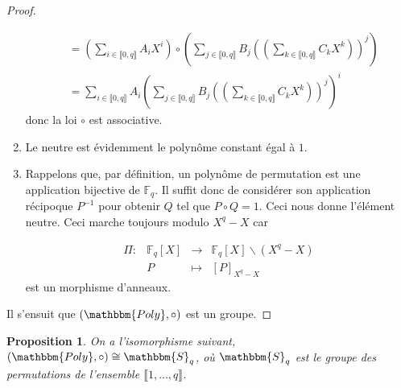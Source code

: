 \documentclass[12pt]{article}
\newcommand{\Fq}{\mathds{F}_q}
\newcommand{\fonction}[5]{
\begin{displaymath}
\begin{array}{l|rcl}
\displaystyle
#1 : & #2 & \longrightarrow & #3 \\
    & #4 & \longmapsto & #5
\end{array}
\end{displaymath}
}
\newtheorem{prop}{Proposition}
\theoremstyle{definition}
\begin{document}
\begin{proof}
\begin{enumerate}[label=$\clubsuit$, font=\small  \color{black}]
			\begin{align*} 
&= \left(\displaystyle\sum_{i \in \llbracket 0, q \rrbracket} A_i X^i\right) \circ \left(\displaystyle\sum_{j \in \llbracket 0, q \rrbracket} B_j \left(\left(\displaystyle\sum_{k \in \llbracket 0, q \rrbracket} C_k X^k\right)\right)^j\right) \\
&=  \displaystyle\sum_{i \in \llbracket 0, q \rrbracket} A_i\left(\displaystyle\sum_{j \in \llbracket 0, q \rrbracket} B_j \left(\left(\displaystyle\sum_{k \in \llbracket 0, q \rrbracket} C_k X^k\right)\right)^j\right)^i
			\end{align*} 
donc la loi $\circ$ est associative.
	\item Le neutre est évidemment le polynôme constant égal à $1$.
	\item Rappelons que, par définition, un polynôme de permutation est une application bijective de $\Fq$. Il suffit donc de considérer son application récipoque $P^{-1}$ pour obtenir $Q$ tel que $P\circ Q = 1$. Ceci nous donne l'élément neutre. Ceci marche toujours modulo $X^q - X$ car
	\fonction{\Pi}{\Fq[X]}{\Fq[X] \backslash (X^q - X)}{P}{[P]_{X^q - X}} est un morphisme d'anneaux.
	\end{enumerate}	
Il s'ensuit que $(\mathbbm{Poly}, \circ)$ est un groupe. 
\end{proof}

\begin{prop}
 On a l'isomorphisme suivant, $(\mathbbm{Poly}, \circ) \cong \mathbbm{S}_q$, où $\mathbbm{S}_q$ est le groupe des permutations de l'ensemble $\llbracket 1, ... , q \rrbracket$.
\end{prop}
\end{document}
